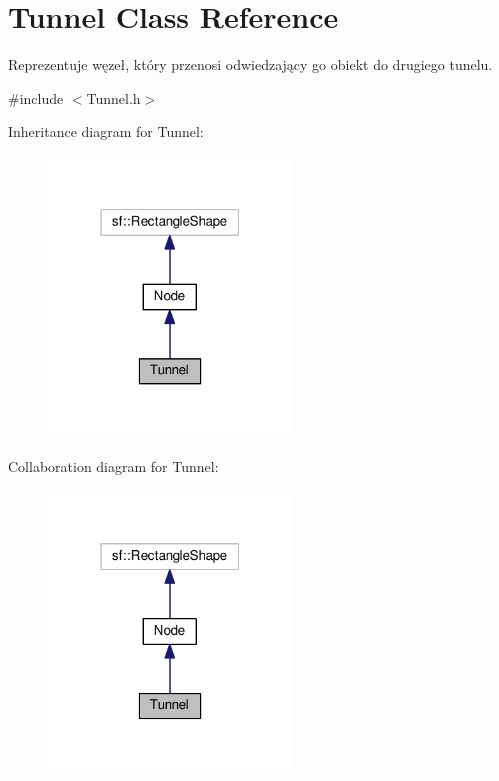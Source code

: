 \hypertarget{classTunnel}{}\section{Tunnel Class Reference}
\label{classTunnel}


Reprezentuje węzeł, który przenosi odwiedzający go obiekt do drugiego tunelu.  




{\ttfamily \#include $<$Tunnel.\+h$>$}



Inheritance diagram for Tunnel\+:\nopagebreak
\begin{figure}[H]
\begin{center}
\leavevmode
\includegraphics[width=183pt]{classTunnel__inherit__graph}
\end{center}
\end{figure}


Collaboration diagram for Tunnel\+:\nopagebreak
\begin{figure}[H]
\begin{center}
\leavevmode
\includegraphics[width=183pt]{classTunnel__coll__graph}
\end{center}
\end{figure}
